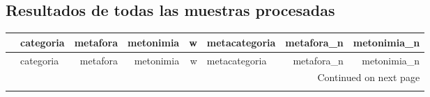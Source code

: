 \documentclass[12pt,letterpaper,twoside]{article}
\begin{document}
\begin{landscape}
\tiny
\section{Resultados de todas las muestras procesadas}

\begin{longtable}{llrrrlrr}
\toprule
{} &                      categoria &      metafora &   metonimia &     w & metacategoria &  metafora\_n &  metonimia\_n \\
\midrule
\endfirsthead

\toprule
{} &                      categoria &      metafora &   metonimia &     w & metacategoria &  metafora\_n &  metonimia\_n \\
\midrule
\endhead
\midrule
\multicolumn{8}{r}{{Continued on next page}} \\
\midrule
\endfoot


\end{longtable}
\end{landscape}
\end{document}
